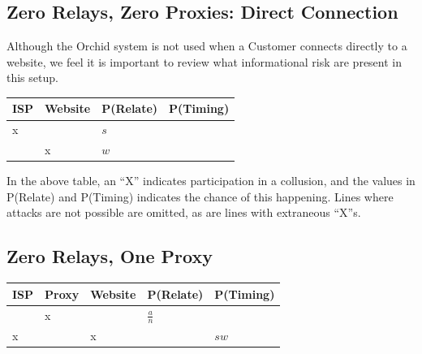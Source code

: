 \documentclass{article}
\newcommand{\orchid}{Orchid}
\newcommand{\Orchid}{\orchid}
\begin{document}
\subsection{Zero Relays, Zero Proxies: Direct Connection}

Although the \Orchid{} system is not used when a Customer connects
directly to a website, we feel it is important to review what
informational risk are present in this setup.

\begin{center}
\begin{tabular}{l | l | l | l}
  ISP & Website & P(Relate)          & P(Timing) \\
  \hline
  x   &         & $s$                & \\
  \hline
      & x       & $w$                & \\
\end{tabular}
\end{center}


In the above table, an ``X'' indicates participation in a collusion,
and the values in P(Relate) and P(Timing) indicates the chance of this
happening. Lines where attacks are not possible are omitted, as are
lines with extraneous ``X''s.

\subsection{Zero Relays, One Proxy}


\begin{center}
\begin{tabular}{l | l | l | l | l}
  ISP & Proxy & Website & P(Relate)          & P(Timing) \\
  \hline
      & x     &         & $\frac{a}{n}$      & \\
  \hline
  x   &       & x       &                    & $sw$ \\
\end{tabular}
\end{center}
\end{document}
